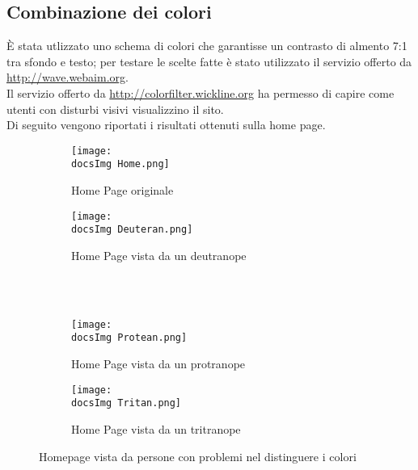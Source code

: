 {	\subsection{Combinazione dei colori}{
		È stata utlizzato uno schema di colori che garantisse un contrasto di almento 7:1 tra sfondo e testo; per testare le scelte fatte è stato utilizzato il servizio offerto da \url{http://wave.webaim.org}.\\
		Il servizio offerto da \url{http://colorfilter.wickline.org} ha permesso di capire come utenti con disturbi visivi visualizzino il sito.\\
		Di seguito vengono riportati i risultati ottenuti sulla home page.
		\begin{figure}[H]
			\begin{subfigure}[b]{0.5\textwidth}
				\texttt{[image: \\docsImg Home.png]}
				\caption{Home Page originale}
				\label{Home Page originale}
			\end{subfigure}
			\begin{subfigure}[b]{0.5\textwidth}
				\texttt{[image: \\docsImg Deuteran.png]}
				\caption{Home Page vista da un deutranope}
				\label{Home Page vista da un deutranope}
			\end{subfigure}
			\\
			\\
			\begin{subfigure}[b]{0.5\textwidth}
				\texttt{[image: \\docsImg Protean.png]}
				\caption{Home Page vista da un protranope}
				\label{Home Page vista da un protranope}
			\end{subfigure}
			\begin{subfigure}[b]{0.5\textwidth}
			\texttt{[image: \\docsImg Tritan.png]}
				\caption{Home Page vista da un tritranope}
				\label{Home Page vista da un tritranope}
			\end{subfigure}
			\caption{Homepage vista da persone con problemi nel distinguere i colori}
			\label{fig: Homepage vista da persone con problemi nel distinguere i colori}
		\end{figure}
	}
}
